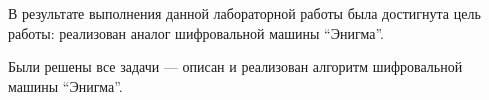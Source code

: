 \Conclusion %

В результате выполнения данной лабораторной работы была достигнута цель работы:  реализован аналог шифровальной машины ``Энигма''.

Были решены все задачи --- описан и реализован алгоритм шифровальной машины ``Энигма''.
